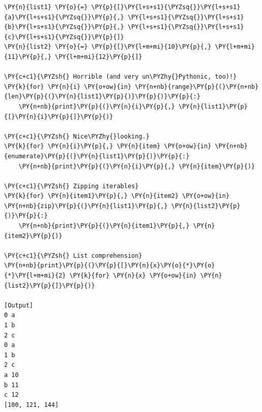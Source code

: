 \begin{Verbatim}[label=\makebox{\url{https://github.com/lucabaldini/cmepda/tree/master/slides/latex/snippets/iteration.py}},commandchars=\\\{\}]
\PY{n}{list1} \PY{o}{=} \PY{p}{[}\PY{l+s+s1}{\PYZsq{}}\PY{l+s+s1}{a}\PY{l+s+s1}{\PYZsq{}}\PY{p}{,} \PY{l+s+s1}{\PYZsq{}}\PY{l+s+s1}{b}\PY{l+s+s1}{\PYZsq{}}\PY{p}{,} \PY{l+s+s1}{\PYZsq{}}\PY{l+s+s1}{c}\PY{l+s+s1}{\PYZsq{}}\PY{p}{]}
\PY{n}{list2} \PY{o}{=} \PY{p}{[}\PY{l+m+mi}{10}\PY{p}{,} \PY{l+m+mi}{11}\PY{p}{,} \PY{l+m+mi}{12}\PY{p}{]}

\PY{c+c1}{\PYZsh{} Horrible (and very un\PYZhy{}Pythonic, too)!}
\PY{k}{for} \PY{n}{i} \PY{o+ow}{in} \PY{n+nb}{range}\PY{p}{(}\PY{n+nb}{len}\PY{p}{(}\PY{n}{list1}\PY{p}{)}\PY{p}{)}\PY{p}{:}
    \PY{n+nb}{print}\PY{p}{(}\PY{n}{i}\PY{p}{,} \PY{n}{list1}\PY{p}{[}\PY{n}{i}\PY{p}{]}\PY{p}{)}

\PY{c+c1}{\PYZsh{} Nice\PYZhy{}looking.}
\PY{k}{for} \PY{n}{i}\PY{p}{,} \PY{n}{item} \PY{o+ow}{in} \PY{n+nb}{enumerate}\PY{p}{(}\PY{n}{list1}\PY{p}{)}\PY{p}{:}
    \PY{n+nb}{print}\PY{p}{(}\PY{n}{i}\PY{p}{,} \PY{n}{item}\PY{p}{)}

\PY{c+c1}{\PYZsh{} Zipping iterables}
\PY{k}{for} \PY{n}{item1}\PY{p}{,} \PY{n}{item2} \PY{o+ow}{in} \PY{n+nb}{zip}\PY{p}{(}\PY{n}{list1}\PY{p}{,} \PY{n}{list2}\PY{p}{)}\PY{p}{:}
    \PY{n+nb}{print}\PY{p}{(}\PY{n}{item1}\PY{p}{,} \PY{n}{item2}\PY{p}{)}

\PY{c+c1}{\PYZsh{} List comprehension}
\PY{n+nb}{print}\PY{p}{(}\PY{p}{[}\PY{n}{x}\PY{o}{*}\PY{o}{*}\PY{l+m+mi}{2} \PY{k}{for} \PY{n}{x} \PY{o+ow}{in} \PY{n}{list2}\PY{p}{]}\PY{p}{)}

[Output]
0 a
1 b
2 c
0 a
1 b
2 c
a 10
b 11
c 12
[100, 121, 144]
\end{Verbatim}
